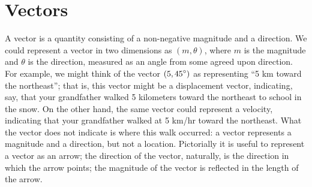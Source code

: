 \section{Vectors}{}{}
\nobreak A vector is a quantity consisting of a
non-negative magnitude and a direction. We could represent a vector in
two dimensions as $(m,\theta)$, where $m$ is the magnitude and
$\theta$ is the direction, measured as an angle from some agreed upon
direction. For example, we might think of the vector $\displaystyle
(5,45^\circ)$ as representing ``5 km toward the northeast''; that is,
this vector might be a {\dfont displacement
vector\/},
indicating, say, that your grandfather walked 5 kilometers toward the
northeast to school in the snow. On the other hand, the same vector
could represent a velocity, indicating that your grandfather walked at
5 km/hr toward the northeast. What the vector does not indicate is
where this walk occurred: a vector represents a magnitude and a
direction, but not a location. Pictorially it is useful to represent a
vector as an arrow; the direction of the vector, naturally, is the
direction in which the arrow points; the magnitude of the vector is
reflected in the length of the arrow.

